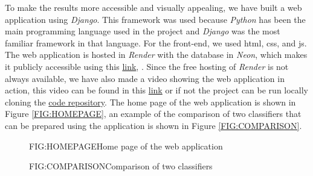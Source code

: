 
To make the results more accessible and visually appealing, we have built a web application using \textit{Django}. This framework was used because \textit{Python} has been the main programming language used in the project and \textit{Django} was the most familiar framework in that language. For the front-end, we used \ac{html}, \ac{css}, and \ac{js}. The web application is hosted in \textit{Render} with the database in \textit{Neon}, which makes it publicly accessible using this 
\href{https://breast-cancer-classification-web.onrender.com/}{link}, .
Since the free hosting of \textit{Render} is not always available, we have also made a video showing the web application in action, this video can be found in this 
\href{https://www.youtube.com/watch?v=ZASpsVNhXPA}{link} 
or if not the project can be run locally cloning the 
\href{https://github.com/LittleHaku/breast-cancer-classification-web}{code repository}. 
The home page of the web application is shown in Figure \ref{FIG:HOMEPAGE}, an example of the comparison of two classifiers that can be prepared using the application is shown in Figure \ref{FIG:COMPARISON}.

\begin{figure}[Web Application]{FIG:HOMEPAGE}{Home page of the web application}
\end{figure}

\begin{figure}[Web Application]{FIG:COMPARISON}{Comparison of two classifiers}
\end{figure}
